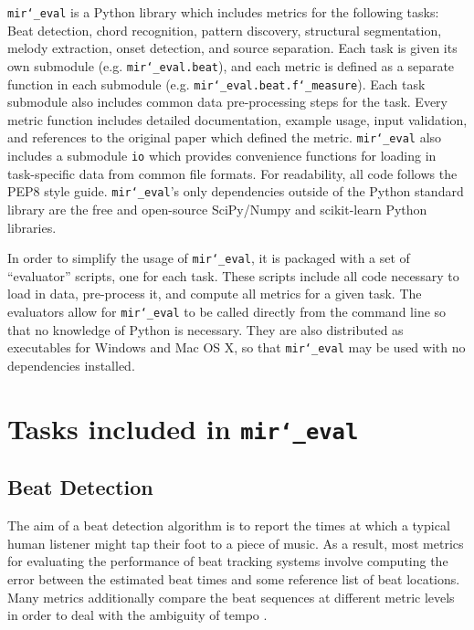 \documentclass{article}
\def\mireval{\texttt{mir\char`_eval}}
\begin{document}
\mireval{} is a Python library which includes metrics for the following tasks: Beat detection, chord recognition, pattern discovery, structural segmentation, melody extraction, onset detection, and source separation.
Each task is given its own submodule (e.g. \mireval{}\texttt{.beat}), and each metric is defined as a separate function in each submodule (e.g. \mireval{}\texttt{.beat.f\char`_measure}).
Each task submodule also includes common data pre-processing steps for the task.
Every metric function includes detailed documentation, example usage, input validation, and references to the original paper which defined the metric.
\mireval{} also includes a submodule \texttt{io} which provides convenience functions for loading in task-specific data from common file formats.
For readability, all code follows the PEP8 style guide\cite{van2001pep}.
\mireval{}'s only dependencies outside of the Python standard library are the free and open-source SciPy/Numpy\cite{jones2001scipy} and scikit-learn\cite{pedregosa2011scikit} Python libraries.

In order to simplify the usage of \mireval{}, it is packaged with a set of ``evaluator'' scripts, one for each task.
These scripts include all code necessary to load in data, pre-process it, and compute all metrics for a given task.
The evaluators allow for \mireval{} to be called directly from the command line so that no knowledge of Python is necessary.
They are also distributed as executables for Windows and Mac OS X, so that \mireval{} may be used with no dependencies installed.

\section{Tasks included in \mireval{}}
\label{sec:tasks}

\subsection{Beat Detection}

The aim of a beat detection algorithm is to report the times at which a typical human listener might tap their foot to a piece of music.
As a result, most metrics for evaluating the performance of beat tracking systems involve computing the error between the estimated beat times and some reference list of beat locations.
Many metrics additionally compare the beat sequences at different metric levels in order to deal with the ambiguity of tempo \cite{levy2011improving}.
\end{document}
